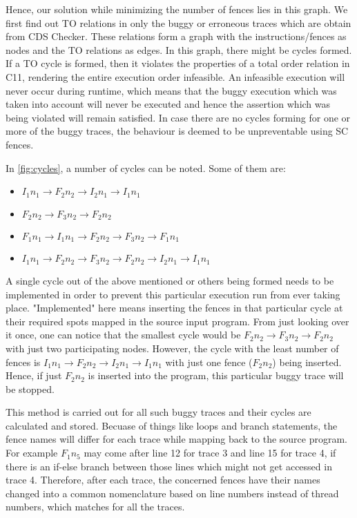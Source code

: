 \par
Hence, our solution while minimizing the number of fences lies in this graph. We first find out TO relations in only the buggy or erroneous traces which are obtain from CDS Checker. These relations form a graph with the instructions/fences as nodes and the TO relations as edges. In this graph, there might be cycles formed. If a TO cycle is formed, then it violates the properties of a total order relation in C11, rendering the entire execution order infeasible. An infeasible execution will never occur during runtime, which means that the buggy execution which was taken into account will never be executed and hence the assertion which was being violated will remain satisfied. In case there are no cycles forming for one or more of the buggy traces, the behaviour is deemed to be unpreventable using SC fences. 

\par
In \ref{fig:cycles}, a number of cycles can be noted. Some of them are:
\begin{itemize}
\item \textit{$I_1n_1 \rightarrow F_2n_2 \rightarrow I_2n_1 \rightarrow I_1n_1$}
\item \textit{$F_2n_2 \rightarrow F_3n_2 \rightarrow F_2n_2$}
\item \textit{$F_1n_1 \rightarrow I_1n_1 \rightarrow F_2n_2 \rightarrow F_3n_2 \rightarrow F_1n_1$}
\item \textit{$I_1n_1 \rightarrow F_2n_2 \rightarrow F_3n_2 \rightarrow F_2n_2 \rightarrow I_2n_1 \rightarrow I_1n_1$}
\end{itemize} 
A single cycle out of the above mentioned or others being formed needs to be implemented in order to prevent this particular execution run from ever taking place. "Implemented" here means inserting the fences in that particular cycle at their required spots mapped in the source input program. From just looking over it once, one can notice that the smallest cycle would be \textit{$F_2n_2 \rightarrow F_3n_2 \rightarrow F_2n_2$} with just two participating nodes. However, the cycle with the least number of fences is \textit{$I_1n_1 \rightarrow F_2n_2 \rightarrow I_2n_1 \rightarrow I_1n_1$} with just one fence (\textit{$F_2n_2$}) being inserted. Hence, if just \textit{$F_2n_2$} is inserted into the program, this particular buggy trace will be stopped. 

\par
This method is carried out for all such buggy traces and their cycles are calculated and stored. Becuase of things like loops and branch statements, the fence names will differ for each trace while mapping back to the source program. For example \textit{$F_1n_5$} may come after line 12 for trace 3 and line 15 for trace 4, if there is an if-else branch between those lines which might not get accessed in trace 4. Therefore, after each trace, the concerned fences have their names changed into a common nomenclature based on line numbers instead of thread numbers, which matches for all the traces.


